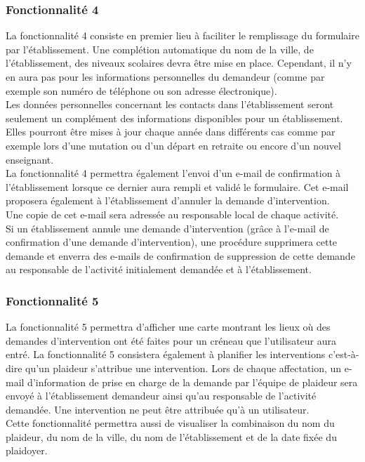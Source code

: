 \subsubsection{Fonctionnalité 4}
La fonctionnalité 4 consiste en premier lieu à faciliter le remplissage du formulaire par l'établissement. 
Une complétion automatique du nom de la ville, de l'établissement, des niveaux scolaires devra être mise en place. Cependant, il n'y en aura pas pour les informations personnelles du demandeur (comme  par exemple son numéro de téléphone ou son adresse électronique).\\
Les données personnelles concernant les contacts dans l'établissement seront seulement un complément des informations disponibles pour un établissement. Elles pourront être mises à jour chaque année dans différents cas comme par exemple lors d'une mutation ou d'un départ en retraite ou encore d'un nouvel enseignant.   \\

La fonctionnalité 4 permettra également l'envoi d'un e-mail de confirmation à l'établissement lorsque ce dernier aura rempli et validé le formulaire. Cet e-mail proposera également à l'établissement d'annuler la demande d'intervention. \\ Une copie de cet e-mail sera adressée au responsable local de chaque activité.\\

Si un établissement annule une demande d'intervention (grâce à l'e-mail de confirmation d'une demande d'intervention), une procédure supprimera cette demande et enverra des e-mails de confirmation de suppression de cette demande au responsable de l'activité initialement demandée et à l'établissement.  

\subsubsection{Fonctionnalité 5}
La fonctionnalité 5 permettra d'afficher une carte montrant les lieux où des demandes d'intervention ont été faites pour un créneau que l'utilisateur aura entré.
La fonctionnalité 5 consistera également à planifier les interventions c'est-à-dire qu'un plaideur s'attribue une intervention.
Lors de chaque affectation, un e-mail d'information de prise en charge de la demande par l'équipe de plaideur sera envoyé à l'établissement demandeur ainsi qu'au responsable de l'activité demandée.
Une intervention ne peut être attribuée qu'à un utilisateur. \\
Cette fonctionnalité permettra aussi de visualiser la combinaison du nom du plaideur, du nom de la ville, du nom de l'établissement et de la date fixée du plaidoyer.

